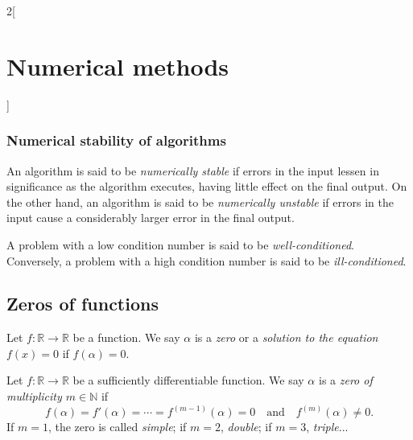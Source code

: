 \documentclass[class=article,10pt,crop=false]{standalone}
\begin{document}
\begin{multicols}{2}[\section{Numerical methods}]
\subsubsection*{Numerical stability of algorithms}
\begin{definition}
An algorithm is said to be \textit{numerically stable} if  errors in the input lessen in significance as the algorithm executes, having little effect on the final output. On the other hand, an algorithm is said to be \textit{numerically unstable} if errors in the input cause a considerably larger error in the final output.
\end{definition}
\begin{definition}
A problem with a low condition number is said to be \textit{well-conditioned}. Conversely, a problem with a high condition number is said to be \textit{ill-conditioned}.
\end{definition}
\subsection{Zeros of functions}
\begin{definition}
Let $f:\mathbb{R}\rightarrow\mathbb{R}$ be a function. We say $\alpha$ is a \textit{zero} or a \textit{solution to the equation $f(x)=0$} if $f(\alpha)=0$.
\end{definition}
\begin{definition}
Let $f:\mathbb{R}\rightarrow\mathbb{R}$ be a sufficiently differentiable function. We say $\alpha$ is a \textit{zero of multiplicity $m\in\mathbb{N}$} if $$f(\alpha)=f'(\alpha)=\cdots=f^{(m-1)}(\alpha)=0\quad\text{and}\quad f^{(m)}(\alpha)\ne0.$$ If $m=1$, the zero is called \textit{simple}; if $m=2$, \textit{double}; if $m=3$, \textit{triple}...
\end{definition}

\end{multicols}
\end{document}
